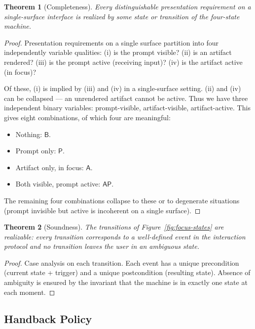\documentclass[11pt,a4paper]{article}
\newtheorem{theorem}{Theorem}[section]
\theoremstyle{definition}
\theoremstyle{remark}
\begin{document}
\begin{theorem}[Completeness]
\label{thm:focus-completeness}
Every distinguishable presentation requirement on a single-surface interface is realized by some state or transition of the four-state machine.
\end{theorem}

\begin{proof}
Presentation requirements on a single surface partition into four independently variable qualities: (i) is the prompt visible? (ii) is an artifact rendered? (iii) is the prompt active (receiving input)? (iv) is the artifact active (in focus)?

Of these, (i) is implied by (iii) and (iv) in a single-surface setting. (ii) and (iv) can be collapsed --- an unrendered artifact cannot be active. Thus we have three independent binary variables: prompt-visible, artifact-visible, artifact-active. This gives eight combinations, of which four are meaningful:
\begin{itemize}
    \item Nothing: $\mathsf{B}$.
    \item Prompt only: $\mathsf{P}$.
    \item Artifact only, in focus: $\mathsf{A}$.
    \item Both visible, prompt active: $\mathsf{AP}$.
\end{itemize}
The remaining four combinations collapse to these or to degenerate situations (prompt invisible but active is incoherent on a single surface).
\end{proof}

\begin{theorem}[Soundness]
\label{thm:focus-soundness}
The transitions of Figure~\ref{fig:focus-states} are realizable: every transition corresponds to a well-defined event in the interaction protocol and no transition leaves the user in an ambiguous state.
\end{theorem}

\begin{proof}
Case analysis on each transition. Each event has a unique precondition (current state + trigger) and a unique postcondition (resulting state). Absence of ambiguity is ensured by the invariant that the machine is in exactly one state at each moment.
\end{proof}

\subsection{Handback Policy}
\end{document}
